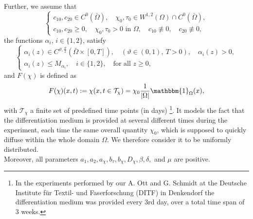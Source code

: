 \documentclass[a4paper,10pt]{article}
\theoremstyle{definition}
\begin{document}
\noindent
Further, we assume that
\begin{equation}
\label{main_ic_assumptions}
  \begin{cases}
    c_{10}, c_{20} \in C^0(\bar{\Omega}), \quad \chi_0, \tau_0 \in W^{1, 2}(\Omega) \cap C^0(\bar{\Omega}), \\[2mm]
    c_{10}, c_{20} \geq 0, \quad \chi_0, \tau_0 > 0 \text{ in } \Omega, \quad c_{10} \not\equiv 0, \quad c_{20} \not\equiv 0,
  \end{cases}
\end{equation}
the functions $\alpha_i$, $i \in \{1, 2\}$, satisfy
\begin{equation}
\label{alpha_def}
\begin{cases}
  \alpha_i(z) \in C^{\vartheta, \frac{\vartheta}{2}}(\bar{\Omega} \times [0, T]), \quad (\vartheta \in (0, 1), ~ T > 0), \quad \alpha_i(z) > 0, \\[1mm]
  \alpha_i(z) \leq M_{\alpha_i}, \quad i \in \{1, 2\}, \quad \text{for all } z \geq 0,
\end{cases}
\end{equation}
and $F(\chi)$ is defined as
\begin{align}
\label{F_assump}
F(\chi)(x, t) := \chi(x, t \in \mathcal{T}_\chi) = \chi_0 \frac{1}{|\Omega|} \mathbbm{1}_\Omega(x),%
\end{align}
with $\mathcal{T}_\chi$ a finite set of predefined time points (in days) \footnote{In the experiments performed by our A. Ott and
	G. Schmidt at the Deutsche Institute f\"ur Textil- und Faserforschung (DITF) in Denkendorf the differentiation medium was provided every 3rd day, over a total time span of 3 weeks.}. It models the fact that the differentiation medium is provided at several different times
during the experiment, each time the same overall quantity $\chi _0$, which is supposed to quickly diffuse within
the whole domain $\Omega $. We therefore consider it to be uniformly distributed. \\[-2ex]

\noindent
Moreover, all parameters $a_1, a_2, a_\chi, b_\tau, b_\chi, D_\chi, \beta, \delta,$ and $\mu$ are positive.\\[-1ex]
\end{document}
